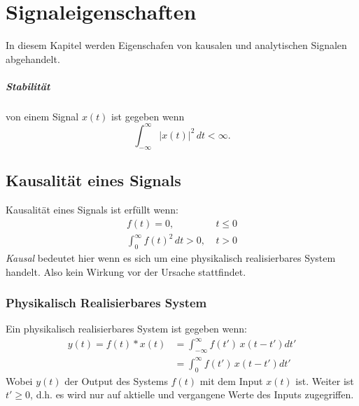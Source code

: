 \chapter{Signaleigenschaften}

In diesem Kapitel werden Eigenschafen von kausalen und analytischen Signalen abgehandelt.\\

\paragraph{Stabilität} von einem Signal $x(t)$ ist gegeben wenn
\begin{equation}
\int_{-\infty}^\infty |x(t)|^2\,dt < \infty.
\end{equation}

\section{Kausalität eines Signals}
Kausalität eines Signals ist erfüllt wenn:
\[
\begin{split}
f(t) = 0 ,&\:t \leq 0\\
\int_0^\infty f(t)^2\,dt > 0,&\:t > 0
\end{split}
\]
\textit{Kausal} bedeutet hier wenn es sich um eine physikalisch realisierbares System handelt. Also kein Wirkung vor der Ursache stattfindet.

\subsection{Physikalisch Realisierbares System}
Ein physikalisch realisierbares System ist gegeben wenn:
\begin{equation}
\begin{split}
y(t) = f(t) * x(t) & = \int_{-\infty}^\infty f(t')\, x(t-t') dt'\\
& =\int_0^\infty f(t')\, x(t-t') dt'
\end{split}
\end{equation}
Wobei $y(t)$ der Output des Systems $f(t)$ mit dem Input $x(t)$ ist. Weiter ist $t' \geq 0$, d.h. es wird nur auf aktielle und vergangene Werte des Inputs zugegriffen.



